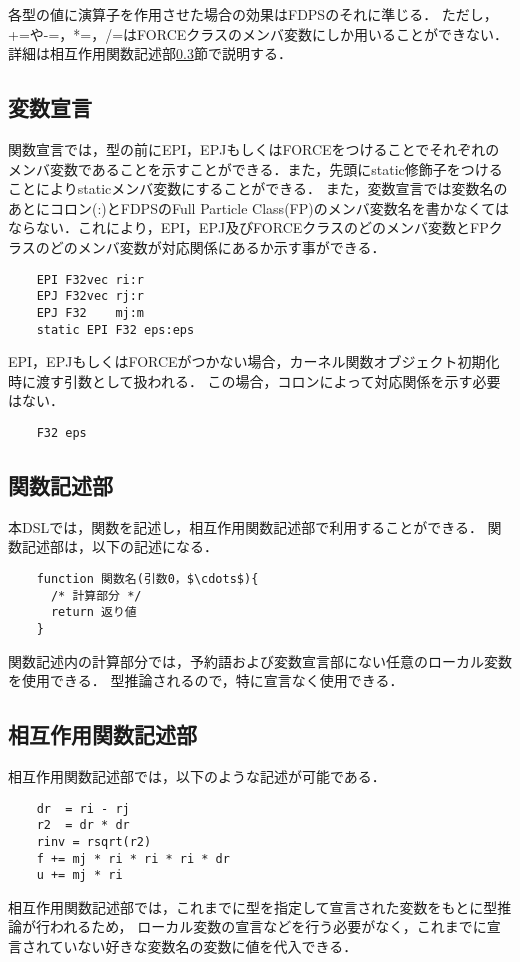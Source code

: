 \documentclass{article}
\begin{document}
 各型の値に演算子を作用させた場合の効果はFDPSのそれに準じる．
 ただし，+=や-=，*=，/=はFORCEクラスのメンバ変数にしか用いることができない．
 詳細は相互作用関数記述部\ref{subsec:kernel}節で説明する．

\subsection{変数宣言}
関数宣言では，型の前にEPI，EPJもしくはFORCEをつけることでそれぞれのメンバ変数であることを示すことができる．また，先頭にstatic修飾子をつけることによりstaticメンバ変数にすることができる．
また，変数宣言では変数名のあとにコロン(:)とFDPSのFull Particle Class(FP)のメンバ変数名を書かなくてはならない．これにより，EPI，EPJ及びFORCEクラスのどのメンバ変数とFPクラスのどのメンバ変数が対応関係にあるか示す事ができる．
\begin{verbatim}
	EPI F32vec ri:r
	EPJ F32vec rj:r
	EPJ F32    mj:m
	static EPI F32 eps:eps
\end{verbatim}

EPI，EPJもしくはFORCEがつかない場合，カーネル関数オブジェクト初期化時に渡す引数として扱われる．
この場合，コロンによって対応関係を示す必要はない．
\begin{verbatim}
	F32 eps
\end{verbatim}


\subsection{関数記述部}
本DSLでは，関数を記述し，相互作用関数記述部で利用することができる．
関数記述部は，以下の記述になる．
\begin{verbatim}
	function 関数名(引数0，$\cdots$){
	  /* 計算部分 */
	  return 返り値
	}
\end{verbatim}

関数記述内の計算部分では，予約語および変数宣言部にない任意のローカル変数を使用できる．
型推論されるので，特に宣言なく使用できる．

\subsection{相互作用関数記述部} \label{subsec:kernel}
相互作用関数記述部では，以下のような記述が可能である．
\begin{verbatim}
	dr  = ri - rj
	r2  = dr * dr
	rinv = rsqrt(r2)
	f += mj * ri * ri * ri * dr
	u += mj * ri
\end{verbatim}

相互作用関数記述部では，これまでに型を指定して宣言された変数をもとに型推論が行われるため，
ローカル変数の宣言などを行う必要がなく，これまでに宣言されていない好きな変数名の変数に値を代入できる．
\end{document}
